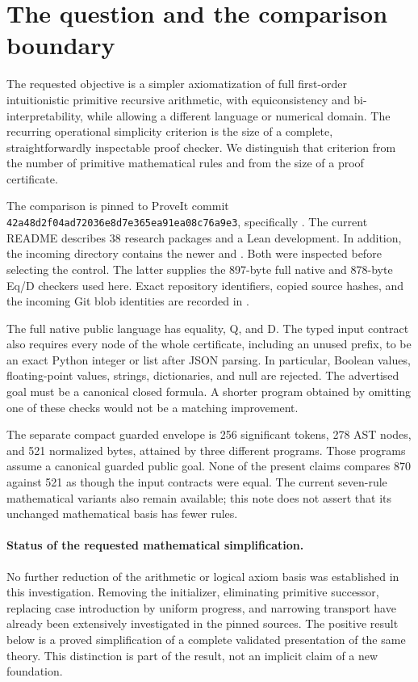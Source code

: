 \documentclass[11pt,letterpaper]{article}
\theoremstyle{definition}
\theoremstyle{remark}
\begin{document}
\clearpage
\tableofcontents
\clearpage

\section{The question and the comparison boundary}
\label{sec:scope}
The requested objective is a simpler axiomatization of full first-order
intuitionistic primitive recursive arithmetic, with equiconsistency and
bi-interpretability, while allowing a different language or numerical
domain. The recurring operational simplicity criterion is the size of a
complete, straightforwardly inspectable proof checker. We distinguish that
criterion from the number of primitive mathematical rules and from the
size of a proof certificate.

The comparison is pinned to ProveIt commit
\texttt{42a48d2f04ad72036e8d7e365ea91ea08c76a9e3}, specifically
.
The current README describes 38 research packages and a Lean development.
In addition, the incoming directory contains the newer
 and
. Both were inspected before
selecting the control. The latter supplies the 897-byte full native and
878-byte Eq/D checkers used here. Exact repository identifiers, copied
source hashes, and the incoming Git blob identities are recorded in
.

The full native public language has equality, Q, and D. The typed input
contract also requires every node of the whole certificate, including an
unused prefix, to be an exact Python integer or list after JSON parsing.
In particular, Boolean values, floating-point values, strings, dictionaries,
and null are rejected. The advertised goal must be a canonical closed
formula. A shorter program obtained by omitting one of these checks would
not be a matching improvement.

The separate compact guarded envelope is 256 significant tokens, 278 AST
nodes, and 521 normalized bytes, attained by three different programs.
Those programs assume a canonical guarded public goal. None of the present
claims compares 870 against 521 as though the input contracts were equal.
The current seven-rule mathematical variants also remain available; this
note does not assert that its unchanged mathematical basis has fewer rules.

\paragraph{Status of the requested mathematical simplification.}
No further reduction of the arithmetic or logical axiom basis was established
in this investigation. Removing the initializer, eliminating primitive
successor, replacing case introduction by uniform progress, and narrowing
transport have already been extensively investigated in the pinned sources.
The positive result below is a proved simplification of a complete validated
presentation of the same theory. This distinction is part of the result,
not an implicit claim of a new foundation.
\end{document}
